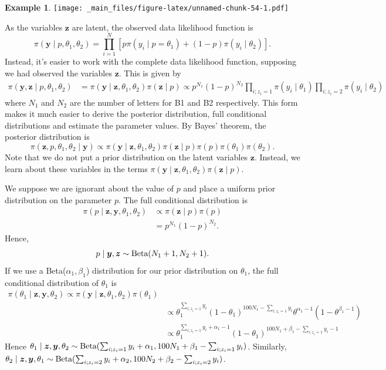 \documentclass[
]{book}
\theoremstyle{definition}
\theoremstyle{definition}
\newtheorem{example}{Example}[chapter]
\theoremstyle{definition}
\theoremstyle{definition}
\theoremstyle{remark}
\begin{document}
\begin{example}
\texttt{[image: \_main\_files/figure-latex/unnamed-chunk-54-1.pdf]}

As the variables \(\boldsymbol{z}\) are latent, the observed data likelihood function is
\[
\pi(\boldsymbol{y} \mid  p, \theta_1, \theta_2) =\prod_{i=1}^N \left[ p\pi(y_i \mid p = \theta_1) + (1-p)\pi(y_i \mid \theta_2)\right].
\]
Instead, it's easier to work with the complete data likelihood function, supposing we had observed the variables \(\boldsymbol{z}\). This is given by
\begin{align*}
\pi(\boldsymbol{y}, \boldsymbol{z} \mid  p, \theta_1, \theta_2) &= \pi(\boldsymbol{y} \mid  \boldsymbol{z}, \theta_1, \theta_2)\pi(\boldsymbol{z} \mid p)
\propto p^{N_1}(1-p)^{N_2} \prod_{i; z_i = 1}\pi(y_i \mid \theta_1)\prod_{i; z_i = 2}\pi(y_i \mid \theta_2)
\end{align*}
where \(N_1\) and \(N_2\) are the number of letters for B1 and B2 respectively. This form makes it much easier to derive the posterior distribution, full conditional distributions and estimate the parameter values. By Bayes' theorem, the posterior distribution is
\[
\pi(\boldsymbol{z}, p, \theta_1, \theta_2 \mid \boldsymbol{y}) \propto \pi(\boldsymbol{y} \mid  \boldsymbol{z}, \theta_1, \theta_2)\pi(\boldsymbol{z} \mid p)\pi(p)\pi(\theta_1)\pi(\theta_2). 
\]
Note that we do not put a prior distribution on the latent variables \(\boldsymbol{z}\). Instead, we learn about these variables in the terms \(\pi(\boldsymbol{y} \mid \boldsymbol{z}, \theta_1, \theta_2)\pi(\boldsymbol{z} \mid p)\).

We suppose we are ignorant about the value of \(p\) and place a uniform prior distribution on the parameter \(p\). The full conditional distribution is
\begin{align*}
\pi(p\mid \boldsymbol{z}, \boldsymbol{y}, \theta_1, \theta_2) &\propto \pi(\boldsymbol{z} \mid p)\pi(p)\\
& = p^{N_1}(1-p)^{N_2}.
\end{align*}
Hence,
\[
p \mid \boldsymbol{y}, \boldsymbol{z} \sim \hbox{Beta}(N_1 + 1, N_2 + 1).
\]
If we use a Beta(\(\alpha_1, \beta_1\)) distribution for our prior distribution on \(\theta_1\), the full conditional distribution of \(\theta_1\) is
\begin{align*}
\pi(\theta_1 \mid \boldsymbol{z}, \boldsymbol{y}, \theta_2) \propto \pi(\boldsymbol{y} \mid  \boldsymbol{z}, \theta_1, \theta_2)\pi(\theta_1) \\
&\propto \theta_1^{\sum_{i; z_i = 1}y_i}(1-\theta_1)^{100N_1 - \sum_{i; z_i = 1}y_i}\theta^{\alpha_1 - 1}(1-\theta^{\beta_1 - 1}) \\
& \propto \theta_1^{\sum_{i; z_i = 1}y_i + \alpha_1 -1 }(1-\theta_1)^{100N_1 + \beta_1 - \sum_{i; z_i = 1}y_i - 1}
\end{align*}
Hence \(\theta_1 \mid \boldsymbol{z}, \boldsymbol{y}, \theta_2 \sim \hbox{Beta}(\sum_{i; z_i = 1}y_i + \alpha_1 , 100N_1 + \beta_1 - \sum_{i; z_i = 1}y_i)\). Similarly, \(\theta_2 \mid \boldsymbol{z}, \boldsymbol{y}, \theta_1 \sim \hbox{Beta}(\sum_{i; z_i = 2}y_i + \alpha_2 , 100N_2 + \beta_2 - \sum_{i; z_i = 2}y_i)\).


\end{example}
\end{document}
